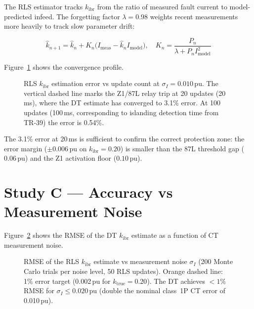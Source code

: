 \documentclass[11pt,a4paper]{article}
\begin{document}
The RLS estimator tracks $k_\mathrm{ibr}$ from the ratio of measured fault
current to model-predicted infeed.  The forgetting factor $\lambda=0.98$
weights recent measurements more heavily to track slow parameter drift:

\begin{equation}
  \hat{k}_{n+1} = \hat{k}_n + K_n \bigl(I_\mathrm{meas} - \hat{k}_n I_\mathrm{model}\bigr),
  \quad
  K_n = \frac{P_n}{\lambda + P_n I_\mathrm{model}^2}
\end{equation}

Figure~\ref{fig:rls} shows the convergence profile.

\begin{figure}[htbp]
  \centering
  \resizebox{0.86\textwidth}{!}{}
  \caption{RLS $k_\mathrm{ibr}$ estimation error vs update count at
           $\sigma_I=0.010$\,pu.  The vertical dashed line marks the Z1/87L
           relay trip at 20 updates (20\,ms), where the DT estimate has
           converged to 3.1\% error.  At 100 updates (100\,ms, corresponding
           to islanding detection time from TR-39) the error is 0.54\%.}
  \label{fig:rls}
\end{figure}

\noindent
The 3.1\% error at 20\,ms is sufficient to confirm the correct protection
zone: the error margin ($\pm0.006$\,pu on $k_\mathrm{ibr}=0.20$) is smaller
than the 87L threshold gap ($0.06$\,pu) and the Z1 activation floor ($0.10$\,pu).

\section{Study C --- Accuracy vs Measurement Noise}
\label{sec:studyC}

Figure~\ref{fig:noise} shows the RMSE of the DT $k_\mathrm{ibr}$ estimate
as a function of CT measurement noise.

\begin{figure}[htbp]
  \centering
  \resizebox{0.86\textwidth}{!}{}
  \caption{RMSE of the RLS $k_\mathrm{ibr}$ estimate vs measurement noise
           $\sigma_I$ (200 Monte Carlo trials per noise level, 50 RLS updates).
           Orange dashed line: 1\% error target (0.002\,pu for
           $k_\mathrm{true}=0.20$).  The DT achieves $<1\%$ RMSE for
           $\sigma_I\leq0.020$\,pu (double the nominal class~1P CT error
           of 0.010\,pu).}
  \label{fig:noise}
\end{figure}
\end{document}
